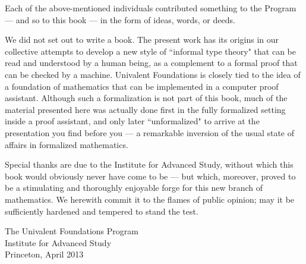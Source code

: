 Each of the above-mentioned individuals contributed something to the Program --- and so to this book --- in the form of ideas, words, or deeds.  

%

We did not set out to write a book. The present work has its origins in our collective attempts to develop a new style of ``informal type theory" that can be read and understood by a human being, as a complement to a formal proof that can be checked by a machine.  %
Univalent Foundations is closely tied to the idea of a foundation of mathematics that can be implemented in a computer proof assistant.  Although such a formalization is not part of this book, much of the material presented here was actually done first in the fully formalized setting inside a proof assistant, and only later ``unformalized" to arrive at the presentation you find before you --- a remarkable inversion of the usual state of affairs in formalized mathematics.  


Special thanks are due to the Institute for Advanced Study, without which this book would obviously never have come to be --- but which, moreover, proved to be a stimulating and thoroughly enjoyable forge for this new branch of mathematics.  We herewith commit it to the flames of public opinion; may it be sufficiently hardened and tempered to stand the test. 

\bigskip

\begin{flushright}
The Univalent Foundations Program\\
Institute for Advanced Study\\
Princeton, April 2013
\end{flushright}

